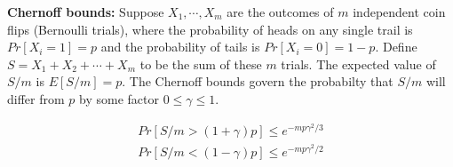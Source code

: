 \begin{enumerate}
{\bf Chernoff bounds:} Suppose $X_1, \cdots, X_m$ are the outcomes of $m$ independent coin flips (Bernoulli trials), where the probability of heads on any single trail is $Pr[X_i = 1] = p$ and the probability of tails is $Pr[X_i = 0] = 1 - p$. Define $S = X_1 + X_2 + \cdots + X_m$ to be the sum of these $m$ trials. The expected value of $S/m$ is $E[S/m] = p$. The Chernoff bounds govern the probabilty that $S/m$ will differ from $p$ by some factor $0 \leq \gamma \leq 1$.

\begin{equation}
    \begin{array}{rcl}
	Pr[S/m > (1 + \gamma) p ] \leq e^{{-mp\gamma^2}/3}\\
	Pr[S/m < (1 - \gamma) p ] \leq e^{{-mp\gamma^2}/2}
	\end{array}
\end{equation}

\end{enumerate}

